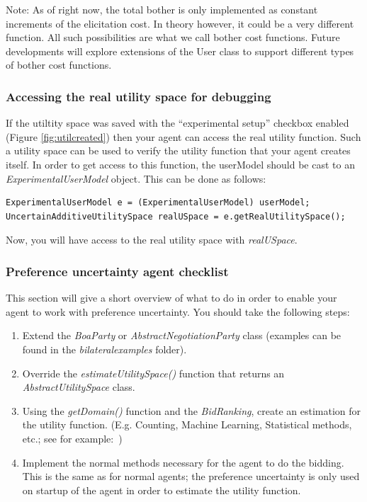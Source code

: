 \documentclass[]{article}
\begin{document}
Note: As of right now, the total bother is only implemented as constant increments of the elicitation cost. In theory however, it could be a very different function. All such possibilities are what we call bother cost functions. Future developments will explore extensions of the User class to support different types of bother cost functions.


\subsubsection{Accessing the real utility space for debugging}
If the utiltity space was saved with the ``experimental setup'' checkbox enabled (Figure \ref{fig:utilcreated}) then your agent can access the real utility function. Such a utility space can be used to verify the utility function that your agent creates itself. In order to get access to this function, the userModel should be cast to an \textit{ExperimentalUserModel} object. This can be done as follows:
\begin{lstlisting}
ExperimentalUserModel e = (ExperimentalUserModel) userModel;
UncertainAdditiveUtilitySpace realUSpace = e.getRealUtilitySpace();
\end{lstlisting}

Now, you will have access to the real utility space with \textit{realUSpace}.

\subsubsection{Preference uncertainty agent checklist}
This section will give a short overview of what to do in order to enable your agent to work with preference uncertainty. You should take the following steps:
\begin{enumerate}
    \item Extend the \textit{BoaParty} or \textit{AbstractNegotiationParty} class (examples can be found in the \textit{bilateralexamples} folder).
    \item Override the \textit{estimateUtilitySpace()} function that returns an \textit{AbstractUtilitySpace} class.
    \item Using the \textit{getDomain()} function and the \textit{BidRanking}, create an estimation for the utility function. (E.g. Counting, Machine Learning, Statistical methods, etc.; see for example:~\cite{Ayd14,BaarslagValueOfInformation,UTAGMS,Ros16,Sri73,Tsi18,Zin18})
    \item Implement the normal methods necessary for the agent to do the bidding. This is the same as for normal agents; the preference uncertainty is only used on startup of the agent in order to estimate the utility function.
\end{enumerate}
\end{document}
